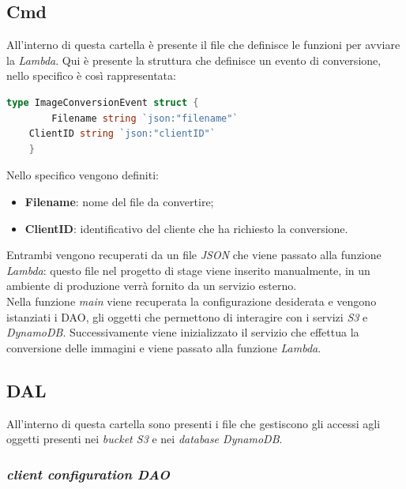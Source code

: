 \subsection{Cmd}

All'interno di questa cartella è presente il file che definisce le funzioni per
avviare la \emph{Lambda}. Qui è presente la struttura che definisce un evento di conversione, nello
specifico è così rappresentata:
\begin{lstlisting}[language=go]
    type ImageConversionEvent struct {
        Filename string `json:"filename"`
	ClientID string `json:"clientID"`
    }
\end{lstlisting}


Nello specifico vengono definiti:
\begin{itemize}
      \item \textbf{Filename}: nome del file da convertire;
      \item \textbf{ClientID}: identificativo del cliente che ha richiesto la
            conversione.
\end{itemize}
Entrambi vengono recuperati da un file \emph{JSON} che viene passato alla
funzione \emph{Lambda}: questo file nel progetto di stage viene inserito
manualmente, in un ambiente di produzione verrà fornito da un servizio
esterno.\\
Nella funzione \emph{main} viene recuperata la configurazione desiderata e
vengono istanziati i \glsfirstoccur\gls{DAO}, gli oggetti che permettono di
interagire con i servizi \emph{S3} e \emph{DynamoDB}. Successivamente viene
inizializzato il servizio che effettua la conversione delle immagini e viene
passato alla funzione \emph{Lambda}.

\subsection{DAL}

All'interno di questa cartella sono presenti i file che gestiscono gli accessi
agli oggetti presenti nei \emph{bucket S3} e nei \emph{database DynamoDB}.

\subsubsection{\emph{client configuration DAO}}

